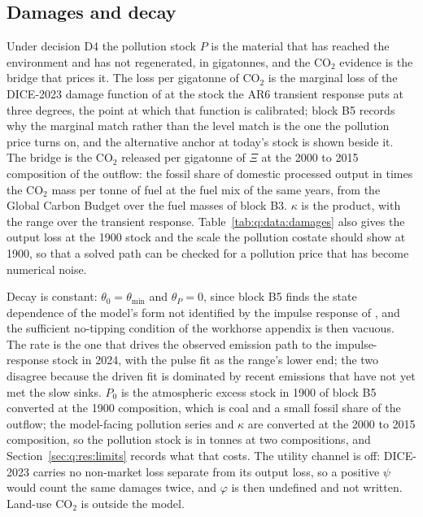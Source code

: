 

\subsection{Damages and decay}\label{sec:q:data:damages}

Under decision D4 the pollution stock $P$ is the material that has reached the environment and has not regenerated, in gigatonnes, and the CO$_2$ evidence is the bridge that prices it. The loss per gigatonne of CO$_2$ is the marginal loss of the DICE-2023 damage function of \textcite{barrage2024} at the stock the AR6 transient response \parencite{canadell2021} puts at three degrees, the point at which that function is calibrated; block B5 records why the marginal match rather than the level match is the one the pollution price turns on, and the alternative anchor at today's stock is shown beside it. The bridge is the CO$_2$ released per gigatonne of $\Xi$ at the 2000 to 2015 composition of the outflow: the fossil share of domestic processed output in \textcite{haas2020} times the CO$_2$ mass per tonne of fuel at the fuel mix of the same years, from the Global Carbon Budget \parencite{friedlingstein2026} over the fuel masses of block B3. $\kappa$ is the product, with the range over the transient response. Table~\ref{tab:q:data:damages} also gives the output loss at the 1900 stock and the scale the pollution costate should show at 1900, so that a solved path can be checked for a pollution price that has become numerical noise.

Decay is constant: $\theta_0=\theta_{\min}$ and $\theta_P=0$, since block B5 finds the state dependence of the model's form not identified by the impulse response of \textcite{joos2013}, and the sufficient no-tipping condition of the workhorse appendix is then vacuous. The rate is the one that drives the observed emission path to the impulse-response stock in 2024, with the pulse fit as the range's lower end; the two disagree because the driven fit is dominated by recent emissions that have not yet met the slow sinks. $P_0$ is the atmospheric excess stock in 1900 of block B5 converted at the 1900 composition, which is coal and a small fossil share of the outflow; the model-facing pollution series and $\kappa$ are converted at the 2000 to 2015 composition, so the pollution stock is in tonnes at two compositions, and Section~\ref{sec:q:res:limits} records what that costs. The utility channel is off: DICE-2023 carries no non-market loss separate from its output loss, so a positive $\psi$ would count the same damages twice, and $\varphi$ is then undefined and not written. Land-use CO$_2$ is outside the model.

